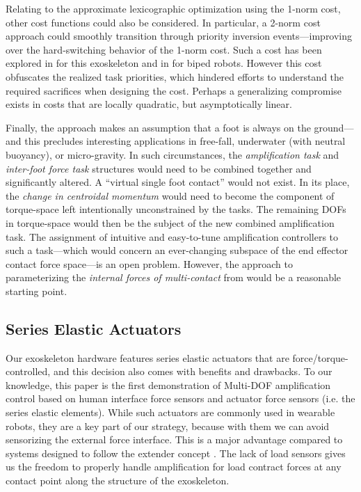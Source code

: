 \documentclass[utf8]{frontiersSCNS}
\renewcommand*{\cite}[1]{\citep{#1}}
\newcommand{\add}[1]{\textcolor[HTML]{8710b3}{#1}}
\begin{document}
\add{Relating to the approximate lexicographic optimization using the 1-norm cost, other cost functions could also be considered. In particular, a 2-norm cost approach could smoothly transition through priority inversion events---improving over the hard-switching behavior of the 1-norm cost. Such a cost has been explored in \cite{Campbell2018Thesis} for this exoskeleton and in \cite{KimJorgensenSentis2020IJRR} for biped robots. However this cost obfuscates the realized task priorities, which hindered efforts to understand the required sacrifices when designing the cost. Perhaps a generalizing compromise exists in costs that are locally quadratic, but asymptotically linear.}



Finally, the approach makes an assumption that a foot is always on the ground---and this precludes interesting applications in free-fall, underwater (with neutral buoyancy), or micro-gravity.
In such circumstances, the \emph{amplification task} and \emph{inter-foot force task} structures would need to be combined together and significantly altered.
A ``virtual single foot contact'' would not exist.
In its place, the \emph{change in centroidal momentum} \cite{KoolenEA2016IJHR} would need to become the component of torque-space left intentionally unconstrained by the tasks.
The remaining DOFs in torque-space would then be the subject of the new combined amplification task.
The assignment of intuitive and easy-to-tune amplification controllers to such a task---which would concern an ever-changing subspace of the end effector contact force space---is an open problem.
However, the approach to parameterizing the \emph{internal forces of multi-contact} from \cite{SentisParkKhatib2010TRO} would be a reasonable starting point.


\subsection{Series Elastic Actuators}

Our exoskeleton hardware features series elastic actuators that are force/torque-controlled, and this decision also comes with benefits and drawbacks.
To our knowledge, this paper is the first demonstration of Multi-DOF amplification control based on human interface force sensors and actuator force sensors (i.e. the series elastic elements).
While such actuators are commonly used in wearable robots, they are a key part of our strategy, because with them we can avoid sensorizing the external force interface.
This is a major advantage compared to systems designed to follow the extender concept \cite{KazerooniGuo1993JDSMC}.
The lack of load sensors gives us the freedom to properly handle amplification for load contract forces at any contact point along the structure of the exoskeleton.
\end{document}
